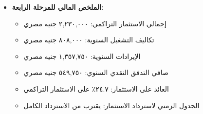 \begin{itemize}
    \item \textbf{الملخص المالي للمرحلة الرابعة:}
    \begin{itemize}
        \item إجمالي الاستثمار التراكمي: ٢,٢٣٠,٠٠٠ جنيه مصري
        \item تكاليف التشغيل السنوية: ٨٠٨,٠٠٠ جنيه مصري
        \item الإيرادات السنوية: ١,٣٥٧,٧٥٠ جنيه مصري
        \item صافي التدفق النقدي السنوي: ٥٤٩,٧٥٠ جنيه مصري
        \item العائد على الاستثمار: ٢٤.٧٪ على الاستثمار التراكمي
        \item الجدول الزمني لاسترداد الاستثمار: يقترب من الاسترداد الكامل
    \end{itemize}
\end{itemize}

